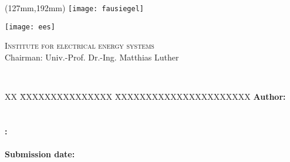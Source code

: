 \begin{titlepage}
	\thispagestyle{empty}

	\begin{textblock*}{\textwidth}(127mm,192mm)
	\texttt{[image: fausiegel]}
	\end{textblock*}

	\begin{minipage}[]{47mm}
		\texttt{[image: ees]}
	\end{minipage}
	\begin{minipage}[]{.7\textwidth}
		\raggedleft
		\textsc{Institute for electrical energy systems}\\ %
		Chairman: Univ.-Prof. Dr.-Ing. Matthias Luther
	\end{minipage}
	
	\vspace{51mm}
	
	{\centering
	
	\large{\arbeit} \\	
	\Large{\titel}
	
	\par}
	
	\vspace{105mm}
	
	{\raggedright
	\begin{tabbing}
	XX \= XXXXXXXXXXXXXXX \= XXXXXXXXXXXXXXXXXXXXXX \kill
			\> \textbf{Author:} 	\> \autor \\
			\>						\> \matrikelnr		\\
	 		\>												\>									\\
			\> \textbf{\langdbbetreuer:}		\> \betreuer \\
			\>												\>									\\
			\> \textbf{Submission date:}	\> \datumAbgabe															
	\end{tabbing}
	\par}
\end{titlepage}
